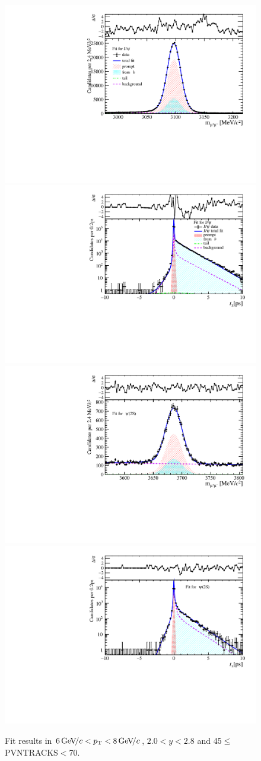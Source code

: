 \begin{figure}[H]
\begin{center}
\includegraphics[width=0.47\linewidth]{pdf/Jpsi/drawmass/n3y1pt4.pdf}
\includegraphics[width=0.47\linewidth]{pdf/Jpsi/2DFit/n3y1pt4.pdf}
\vspace*{-0.5cm}
\includegraphics[width=0.47\linewidth]{pdf/Psi2S/drawmass/n3y1pt4.pdf}
\includegraphics[width=0.47\linewidth]{pdf/Psi2S/2DFit/n3y1pt4.pdf}
\vspace*{-0.5cm}
\end{center}
\caption{Fit results in $6\text{\,Ge\kern -0.1em V\!/}c<p_{\mathrm{T}}<8\text{\,Ge\kern -0.1em V\!/}c$, $2.0<y<2.8$ and 45$\leq$PVNTRACKS$<$70.}
\label{Fitn3y1pt4}
\end{figure}
